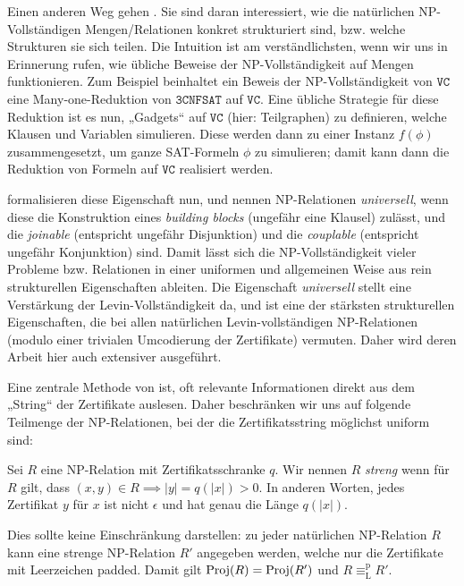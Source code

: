 Einen anderen Weg gehen \textcite{agrawal_universal_1992}. Sie sind daran interessiert, wie die natürlichen NP-Vollständigen Mengen/Relationen konkret strukturiert sind, bzw. welche Strukturen sie sich teilen. 
Die Intuition ist am verständlichsten, wenn wir uns in Erinnerung rufen, wie übliche Beweise der NP-Vollständigkeit auf Mengen funktionieren.
Zum Beispiel beinhaltet ein Beweis der NP-Vollständigkeit von $\mathtt{VC}$ eine Many-one-Reduktion von $\mathtt{3CNFSAT}$ auf $\mathtt{VC}$. 
Eine übliche Strategie für diese Reduktion ist es nun, „Gadgets“ auf $\mathtt{VC}$ (hier: Teilgraphen) zu definieren, welche Klausen und Variablen simulieren. Diese werden dann zu einer Instanz $f(\phi)$ zusammengesetzt, um ganze SAT-Formeln $\phi$ zu simulieren; damit kann dann die Reduktion von Formeln auf $\mathtt{VC}$ realisiert werden.

\citeauthor{agrawal_universal_1992} formalisieren diese Eigenschaft nun, und nennen NP-Relationen \emph{universell}, wenn diese die Konstruktion eines \emph{building blocks} (ungefähr eine Klausel) zulässt, und die \emph{joinable} (entspricht ungefähr Disjunktion) und die \emph{couplable} (entspricht ungefähr Konjunktion) sind. Damit lässt sich die NP-Vollständigkeit vieler Probleme bzw. Relationen in einer uniformen und allgemeinen Weise aus rein strukturellen Eigenschaften ableiten. 
Die Eigenschaft \emph{universell} stellt eine Verstärkung der Levin-Vollständigkeit da, und ist eine der stärksten strukturellen Eigenschaften, die \citeauthor{agrawal_universal_1992} bei allen natürlichen Levin-vollständigen NP-Relationen (modulo einer trivialen Umcodierung der Zertifikate) vermuten. Daher wird deren Arbeit hier auch extensiver ausgeführt.

Eine zentrale Methode von \citeauthor{agrawal_universal_1992} ist, oft relevante Informationen direkt aus dem „String“ der Zertifikate auslesen. Daher beschränken wir uns auf folgende Teilmenge der NP-Relationen, bei der die Zertifikatsstring möglichst uniform sind: 
\begin{definition}
    Sei $R$ eine NP-Relation mit Zertifikatsschranke $q$. 
    Wir nennen $R$ \emph{streng} wenn für $R$ gilt, dass $(x,y)\in R\implies |y|=q(|x|)>0$. In anderen Worten, jedes Zertifikat $y$ für $x$ ist nicht $\epsilon$ und hat genau die Länge $q(|x|)$.
\end{definition}
Dies sollte keine Einschränkung darstellen: zu jeder natürlichen NP-Relation $R$ kann eine strenge NP-Relation $R'$ angegeben werden, welche nur die Zertifikate mit Leerzeichen padded. Damit gilt $\operatorname{Proj}(R)=\operatorname{Proj}(R')$ und $R\equiv_\mathrm L^\mathrm p R'$.

